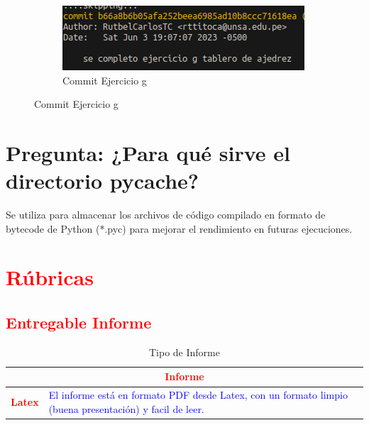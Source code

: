\documentclass{article}
\begin{document}
\begin{itemize}
\begin{figure}[H]
      \vspace{0.5cm}
      
      \begin{subfigure}[b]{0.4\textwidth}
        \centering
        \includegraphics[width=\textwidth]{img/commits/commitEjer-g.png}
        \caption{Commit Ejercicio g}
      \end{subfigure}

    \end{figure}
        
\end{itemize}

\section{Pregunta: ¿Para qué sirve el directorio pycache?}
Se utiliza para almacenar los archivos de código compilado en formato de bytecode de Python (*.pyc) para mejorar el rendimiento en futuras ejecuciones.


\section{\textcolor{red}{Rúbricas}}
\subsection{\textcolor{red}{Entregable Informe}}
\begin{table}[H]
	\caption{Tipo de Informe}
	\setlength{\tabcolsep}{0.5em} %
	{\renewcommand{\arraystretch}{1.5}%

		\begin{tabular}{|p{3cm}|p{12cm}|}
			\hline
			\multicolumn{2}{|c|}{\textbf{\textcolor{red}{Informe}}}                                                                                                      \\
			\hline
			\textbf{\textcolor{red}{Latex}} & \textcolor{blue}{El informe está en formato PDF desde Latex,  con un formato limpio (buena presentación) y facil de leer.} \\
			\hline
		\end{tabular}
	}
\end{table}
\end{document}
